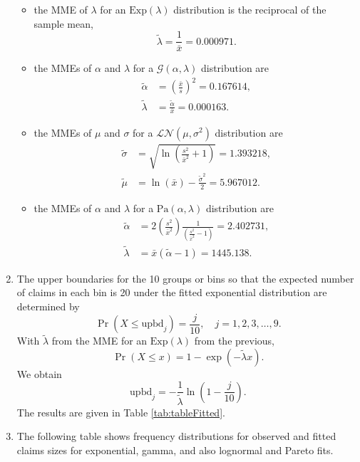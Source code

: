 \documentclass[landscape, 20pt]{extreport}
\theoremstyle{definition}
\theoremstyle{definition}
\theoremstyle{definition}
\theoremstyle{definition}
\theoremstyle{remark}
\begin{document}
\begin{enumerate}
  \begin{itemize}
  \item
    the MME of \(\lambda\) for an \(\text{Exp}(\lambda)\) distribution
    is the reciprocal of the sample mean,
    \[\tilde{\lambda} = \frac{1}{\bar{x}} = 0.000971.\]
  \item
    the MMEs of \(\alpha\) and \(\lambda\) for a
    \(\mathcal{G}(\alpha, \lambda)\) distribution are
    \[\begin{aligned}
    \tilde{\alpha} &= \left(\frac{\bar{x}}{s}\right)^2 = 0.167614, \\
    \tilde{\lambda} &= \frac{\tilde{\alpha}}{\bar{x}} = 0.000163.\end{aligned}\]
  \item
    the MMEs of \(\mu\) and \(\sigma\) for a
    \(\mathcal{LN}(\mu, \sigma^2)\) distribution are \[\begin{aligned}
    \tilde{\sigma} &= \sqrt{ \ln \left(  \frac{s^2}{\bar{x}^2} + 1 \right)  }  = 1.393218, \\
    \tilde{\mu} &= \ln(\bar{x}) - \frac{\tilde{\sigma}^2 }{2} = 5.967012.\end{aligned}\]
  \item
    the MMEs of \(\alpha\) and \(\lambda\) for a
    \(\text{Pa}(\alpha, \lambda)\) distribution are \[\begin{aligned}
    \tilde{\alpha} &= \displaystyle{ 2 \left(  \frac{s^2}{\bar{x}^2} \right) \frac{1}{(\frac{s^2}{\bar{x}^2} - 1)}   } = 2.402731,\\
    \tilde{\lambda} &= \bar{x} (\tilde{\alpha} - 1) = 1445.138.\end{aligned}\]
  \end{itemize}
\item
  The upper boundaries for the 10 groups or bins so that the expected
  number of claims in each bin is 20 under the fitted exponential
  distribution are determined by
  \[\Pr(X \le \text{upbd}_j) = \frac{j}{10}, \quad j = 1,2,3, \ldots, 9.\]
  With \(\tilde{\lambda}\) from the MME for an \(\text{Exp}(\lambda)\) from the previous,
  \[\Pr(X \le x)  = 1 - \exp(-\tilde{\lambda} x).\] We obtain
  \[\text{upbd}_j = -\frac{1}{\tilde{\lambda}} \ln\left( 1 - \frac{j}{10}\right).\]
  The results are given in Table \ref{tab:tableFitted}.
\item
  The following table shows frequency distributions for observed and
  fitted claims sizes for exponential, gamma, and also lognormal and Pareto fits.
\end{enumerate}
\end{document}
